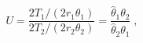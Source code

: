 

\[
U = \frac{2T_1/(2r_1\theta_1)} {2T_2/(2r_2\theta_2)} = \frac {\hat{\theta}_1\theta_2} {\hat{\theta}_2\theta_1} \; ,
\]


